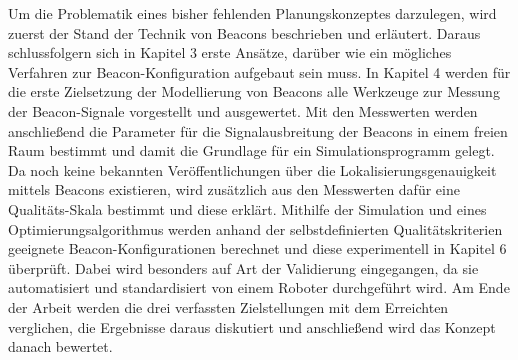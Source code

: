 Um die Problematik eines bisher fehlenden Planungskonzeptes darzulegen, wird zuerst der Stand der Technik von Beacons beschrieben und erläutert. Daraus schlussfolgern sich in Kapitel 3 erste Ansätze, darüber wie ein mögliches Verfahren zur Beacon-Konfiguration aufgebaut sein muss. In Kapitel 4 werden für die erste Zielsetzung der Modellierung von Beacons alle Werkzeuge zur Messung der Beacon-Signale vorgestellt und ausgewertet. Mit den Messwerten werden anschließend die Parameter für die Signalausbreitung der Beacons in einem freien Raum bestimmt und damit die Grundlage für ein Simulationsprogramm gelegt. Da noch keine bekannten Veröffentlichungen über die Lokalisierungsgenauigkeit mittels Beacons existieren, wird zusätzlich aus den Messwerten dafür eine Qualitäts-Skala bestimmt und diese erklärt. Mithilfe der Simulation und eines Optimierungsalgorithmus werden anhand der selbstdefinierten Qualitätskriterien geeignete Beacon-Konfigurationen berechnet und diese experimentell in Kapitel 6 überprüft. Dabei wird besonders auf Art der Validierung eingegangen, da sie automatisiert und standardisiert von einem Roboter durchgeführt wird. Am Ende der Arbeit werden die drei verfassten Zielstellungen mit dem Erreichten verglichen, die Ergebnisse daraus diskutiert und anschließend wird das Konzept danach bewertet. 
 






%
%
%
%
%
%
%
%
